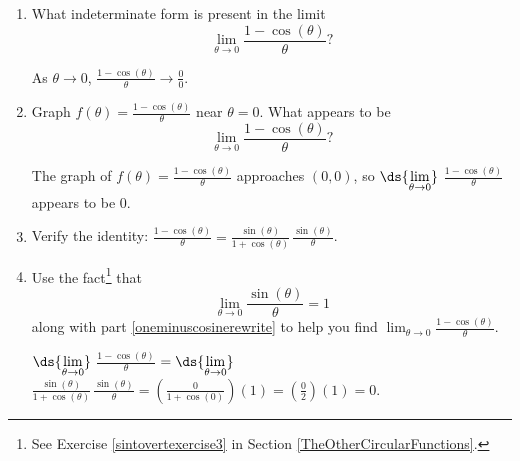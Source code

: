 \documentclass{ximera}
\begin{document}
\begin{problem}\label{oneminuscosinelimit}

\begin{enumerate}  

\item What indeterminate form is present in the limit $$\lim_{\theta \rightarrow 0} \frac{1 - \cos(\theta)}{\theta}?$$

\begin{solution}
As $\theta \rightarrow 0$,  $\frac{1 - \cos(\theta)}{\theta} \rightarrow \frac{0}{0}$.
\end{solution}

\item  Graph $f(\theta) = \frac{1 - \cos(\theta)}{\theta}$ near $\theta = 0$. What appears to be $$\lim_{\theta \rightarrow 0} \frac{1 - \cos(\theta)}{\theta}?$$

\begin{solution}
The graph of  $f(\theta) = \frac{1 - \cos(\theta)}{\theta}$ approaches $(0,0)$, so   $\ds{\lim_{\theta \rightarrow 0}}$ $\frac{1 - \cos(\theta)}{\theta}$ appears to be $0$.
\end{solution}

\item\label{oneminuscosinerewrite}  Verify the identity:  $\frac{1 - \cos(\theta)}{\theta} = \frac{\sin(\theta)}{1 + \cos(\theta)} \, \frac{\sin(\theta)}{\theta}$.


\item  Use the fact\footnote{See Exercise \ref{sintovertexercise3} in Section \ref{TheOtherCircularFunctions}.} that $$\lim_{\theta \rightarrow 0} \frac{\sin(\theta)}{\theta} = 1$$ along with  part \ref{oneminuscosinerewrite} to help you find $\lim_{\theta \rightarrow 0} \frac{1 - \cos(\theta)}{\theta}$.

\begin{solution}
$\ds{\lim_{\theta \rightarrow 0}}$ $\frac{1 - \cos(\theta)}{\theta}$ $= \ds{\lim_{\theta \rightarrow 0}}$ $\frac{\sin(\theta)}{1 + \cos(\theta)} \, \frac{\sin(\theta)}{\theta} = \left(\frac{0}{1+\cos(0)}\right)(1) = \left(\frac{0}{2}\right)(1) = 0$.
\end{solution}

\end{enumerate}

\end{problem}
\end{document}
